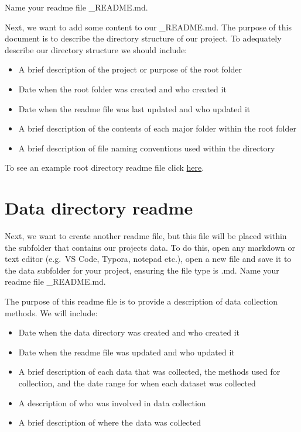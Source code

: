 \documentclass[
]{book}
\providecommand{\tightlist}{%
  \setlength{\itemsep}{0pt}\setlength{\parskip}{0pt}}
\begin{document}
Name your readme file \_README.md.

Next, we want to add some content to our \_README.md. The purpose of this document is to describe the directory structure of our project. To adequately describe our directory structure we should include:

\begin{itemize}
\tightlist
\item
  A brief description of the project or purpose of the root folder
\item
  Date when the root folder was created and who created it
\item
  Date when the readme file was last updated and who updated it
\item
  A brief description of the contents of each major folder within the root folder
\item
  A brief description of file naming conventions used within the directory
\end{itemize}

To see an example root directory readme file click \href{files/DS_rootREADME.md}{here}.

\section{Data directory readme}\label{data-directory-readme}

Next, we want to create another readme file, but this file will be placed within the subfolder that contains our project\textquotesingle s data. To do this, open any markdown or text editor (e.g.~VS Code, Typora, notepad etc.), open a new file and save it to the data subfolder for your project, ensuring the file type is .md. Name your readme file \_README.md.

The purpose of this readme file is to provide a description of data collection methods. We will include:

\begin{itemize}
\tightlist
\item
  Date when the data directory was created and who created it
\item
  Date when the readme file was updated and who updated it
\item
  A brief description of each data that was collected, the methods used for collection, and the date range for when each dataset was collected
\item
  A description of who was involved in data collection
\item
  A brief description of where the data was collected
\end{itemize}
\end{document}
